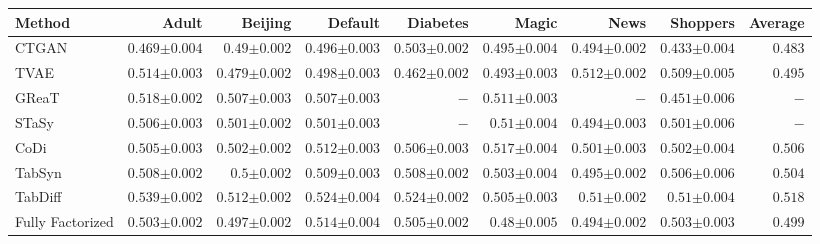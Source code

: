 \begin{tabular}{lrrrrrrr|r}
    \toprule[0.8pt]
     \textbf{Method} & \textbf{Adult} & \textbf{Beijing} & \textbf{Default} & \textbf{Diabetes} & \textbf{Magic} & \textbf{News} & \textbf{Shoppers} & \textbf{Average} \\
    \midrule 
    CTGAN & $0.469${\tiny${\pm 0.004}$} & $0.49${\tiny${\pm 0.002}$} & $0.496${\tiny${\pm 0.003}$} & $0.503${\tiny${\pm 0.002}$} & $0.495${\tiny${\pm 0.004}$} & $0.494${\tiny${\pm 0.002}$} & $0.433${\tiny${\pm 0.004}$} & $0.483$ \\
    TVAE & $0.514${\tiny${\pm 0.003}$} & $0.479${\tiny${\pm 0.002}$} & $0.498${\tiny${\pm 0.003}$} & $0.462${\tiny${\pm 0.002}$} & $0.493${\tiny${\pm 0.003}$} & $0.512${\tiny${\pm 0.002}$} & $0.509${\tiny${\pm 0.005}$} & $0.495$ \\
    GReaT & $0.518${\tiny${\pm 0.002}$} & $0.507${\tiny${\pm 0.003}$} & $0.507${\tiny${\pm 0.003}$} & $-$ & $0.511${\tiny${\pm 0.003}$} & $-$ & $0.451${\tiny${\pm 0.006}$} & $-$ \\
    STaSy & $0.506${\tiny${\pm 0.003}$} & $0.501${\tiny${\pm 0.002}$} & $0.501${\tiny${\pm 0.003}$} & $-$ & $0.51${\tiny${\pm 0.004}$} & $0.494${\tiny${\pm 0.003}$} & $0.501${\tiny${\pm 0.006}$} & $-$ \\
    CoDi & $0.505${\tiny${\pm 0.003}$} & $0.502${\tiny${\pm 0.002}$} & $0.512${\tiny${\pm 0.003}$} & $0.506${\tiny${\pm 0.003}$} & $0.517${\tiny${\pm 0.004}$} & $0.501${\tiny${\pm 0.003}$} & $0.502${\tiny${\pm 0.004}$} & $0.506$ \\
    TabSyn & $0.508${\tiny${\pm 0.002}$} & $0.5${\tiny${\pm 0.002}$} & $0.509${\tiny${\pm 0.003}$} & $0.508${\tiny${\pm 0.002}$} & $0.503${\tiny${\pm 0.004}$} & $0.495${\tiny${\pm 0.002}$} & $0.506${\tiny${\pm 0.006}$} & $0.504$ \\
    TabDiff & $0.539${\tiny${\pm 0.002}$} & $0.512${\tiny${\pm 0.002}$} & $0.524${\tiny${\pm 0.004}$} & $0.524${\tiny${\pm 0.002}$} & $0.505${\tiny${\pm 0.003}$} & $0.51${\tiny${\pm 0.002}$} & $0.51${\tiny${\pm 0.004}$} & $0.518$ \\
    \midrule
    Fully Factorized & $0.503${\tiny${\pm 0.002}$} & $0.497${\tiny${\pm 0.002}$} & $0.514${\tiny${\pm 0.004}$} & $0.505${\tiny${\pm 0.002}$} & $0.48${\tiny${\pm 0.005}$} & $0.494${\tiny${\pm 0.002}$} & $0.503${\tiny${\pm 0.003}$} & $0.499$ \\

\end{tabular}

